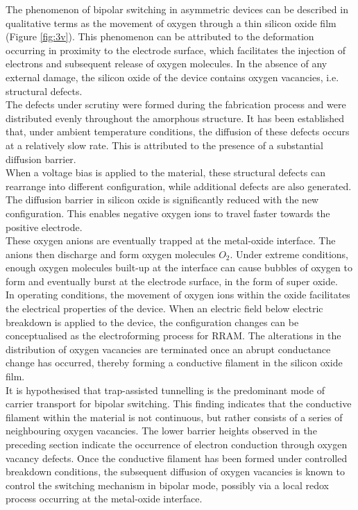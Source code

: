 \noindent The phenomenon of bipolar switching in asymmetric devices can be described in qualitative terms as the movement of oxygen through a thin silicon oxide film (Figure \ref{fig:3v}). This phenomenon can be attributed to the deformation occurring in proximity to the electrode surface, which facilitates the injection of electrons and subsequent release of oxygen molecules. In the absence of any external damage, the silicon oxide of the device contains oxygen vacancies, i.e. structural defects. \\

\noindent The defects under scrutiny were formed during the fabrication process and were distributed evenly throughout the amorphous structure. It has been established that, under ambient temperature conditions, the diffusion of these defects occurs at a relatively slow rate. This is attributed to the presence of a substantial diffusion barrier. \\

\noindent When a voltage bias is applied to the material, these structural defects can rearrange into different configuration, while additional defects are also generated. The diffusion barrier in silicon oxide is significantly reduced with the new configuration. This enables negative oxygen ions to travel faster towards the positive electrode.\\

\noindent These oxygen anions are eventually trapped at the metal-oxide interface. The anions then discharge and form oxygen molecules $O_2$. Under extreme conditions, enough oxygen molecules built-up at the interface can cause bubbles of oxygen to form and eventually burst at the electrode surface, in the form of super oxide. \\

\noindent In operating conditions, the movement of oxygen ions within the oxide facilitates the electrical properties of the device. When an electric field below electric breakdown is applied to the device, the configuration changes can be conceptualised as the electroforming process for RRAM. The alterations in the distribution of oxygen vacancies are terminated once an abrupt conductance change has occurred, thereby forming a conductive filament in the silicon oxide film.\\

\noindent It is hypothesised that trap-assisted tunnelling is the predominant mode of carrier transport for bipolar switching. This finding indicates that the conductive filament within the material is not continuous, but rather consists of a series of neighbouring oxygen vacancies. The lower barrier heights observed in the preceding section indicate the occurrence of electron conduction through oxygen vacancy defects. Once the conductive filament has been formed under controlled breakdown conditions, the subsequent diffusion of oxygen vacancies is known to control the switching mechanism in bipolar mode, possibly via a local redox process occurring at the metal-oxide interface.\\

